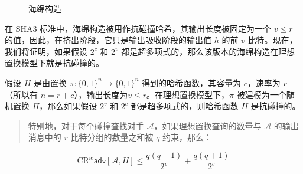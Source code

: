 \begin{figure}
	\centering
	
	\caption{海绵构造}
	\label{fig:8-11}
\end{figure}

在 SHA3 标准中，海绵构造被用作抗碰撞哈希，其输出长度被固定为一个 $v\leq r$ 的值，因此，在挤出阶段，它只是输出吸收阶段的输出值 $h$ 的前 $v$ 比特。现在，我们将证明，如果假设 $2^c$ 和 $2^v$ 都是超多项式的，那么该版本的海绵构造在理想置换模型下就是抗碰撞的。

\begin{theorem}\label{theo:8-6}
假设 $H$ 是由置换 $\pi:\{0,1\}^n\to\{0,1\}^n$ 得到的哈希函数，其容量为 $c$，速率为 $r$（所以有 $n=r+c$），输出长度为$v\leq r$。在理想置换模型下，$\pi$ 被建模为一个随机置换 $\Pi$，那么如果假设 $2^v$ 和 $2^c$ 都是超多项式的，则哈希函数 $H$ 是抗碰撞的。
\begin{quote}
特别地，对于每个碰撞查找对手 $\mathcal{A}$，如果理想置换查询的数量与 $\mathcal{A}$ 的输出消息中的 $r$ 比特分组的数量之和被 $q$ 约束，那么：
\end{quote}
\[
\mathrm{CR}^\mathrm{ic}\mathsf{adv}[\mathcal{A},H]
\leq
\frac{q(q-1)}{2^v}+\frac{q(q+1)}{2^c}
\]
\end{theorem}

